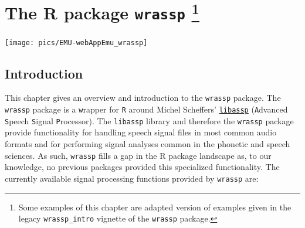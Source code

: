 \documentclass[]{book}
\begin{document}
\hypertarget{chap:wrassp}{%
\chapter[The R package \texttt{wrassp} ]{\texorpdfstring{The R package \texttt{wrassp} \footnote{Some examples of this chapter are adapted version of examples given in the legacy \texttt{wrassp\_intro} vignette of the \texttt{wrassp} package.}}{The R package wrassp }}\label{chap:wrassp}}

\begin{center}\texttt{[image: pics/EMU-webAppEmu\_wrassp]} \end{center}

\hypertarget{introduction}{%
\section{Introduction}\label{introduction}}

This chapter gives an overview and introduction to the \texttt{wrassp} package. The \texttt{wrassp} package is a \texttt{w}rapper for \texttt{R} around Michel Scheffers' \href{http://libassp.sourceforge.net/}{\texttt{libassp}} (\texttt{A}dvanced \texttt{S}peech \texttt{S}ignal \texttt{P}rocessor). The \texttt{libassp} library and therefore the \texttt{wrassp} package provide functionality for handling speech signal files in most common audio formats and for performing signal analyses common in the phonetic and speech sciences. As such, \texttt{wrassp} fills a gap in the R package landscape as, to our knowledge, no previous packages provided this specialized functionality. The currently available signal processing functions provided by \texttt{wrassp} are:
\end{document}
